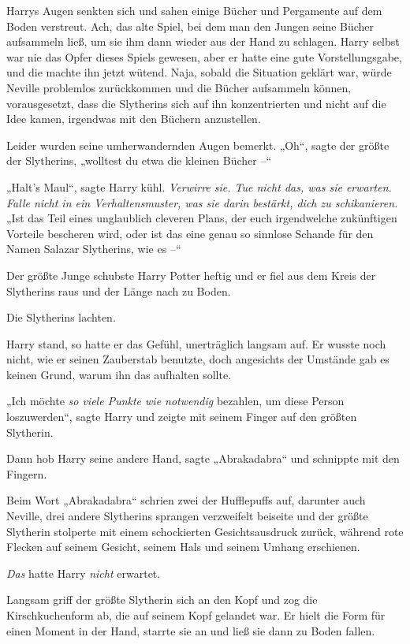 {Harrys Augen senkten sich und sahen einige Bücher und Pergamente auf dem Boden verstreut. Ach, das alte Spiel, bei dem man den Jungen seine Bücher aufsammeln ließ, um sie ihm dann wieder aus der Hand zu schlagen. Harry selbst war nie das Opfer dieses Spiels gewesen, aber er hatte eine gute Vorstellungsgabe, und die machte ihn jetzt wütend. Naja, sobald die Situation geklärt war, würde Neville problemlos zurückkommen und die Bücher aufsammeln können, vorausgesetzt, dass die Slytherins sich auf ihn konzentrierten und nicht auf die Idee kamen, irgendwas mit den Büchern anzustellen.

Leider wurden seine umherwandernden Augen bemerkt. „Oh“, sagte der größte der Slytherins, „wolltest du etwa die kleinen Bücher --“

„Halt's Maul“, sagte Harry kühl. \emph{Verwirre sie. Tue nicht das, was sie erwarten. Falle nicht in ein Verhaltensmuster, was sie darin bestärkt, dich zu schikanieren.} „Ist das Teil eines unglaublich cleveren Plans, der euch irgendwelche zukünftigen Vorteile bescheren wird, oder ist das eine genau so sinnlose Schande für den Namen Salazar Slytherins, wie es --“

Der größte Junge schubste Harry Potter heftig und er fiel aus dem Kreis der Slytherins raus und der Länge nach zu Boden.

Die Slytherins lachten.

Harry stand, so hatte er das Gefühl, unerträglich langsam auf. Er wusste noch nicht, wie er seinen Zauberstab benutzte, doch angesichts der Umstände gab es keinen Grund, warum ihn das aufhalten sollte.

„Ich möchte \emph{so viele Punkte wie notwendig} bezahlen, um diese Person loszuwerden“, sagte Harry und zeigte mit seinem Finger auf den größten Slytherin.

Dann hob Harry seine andere Hand, sagte „Abrakadabra“ und schnippte mit den Fingern.

Beim Wort „Abrakadabra“ schrien zwei der Hufflepuffs auf, darunter auch Neville, drei andere Slytherins sprangen verzweifelt beiseite und der größte Slytherin stolperte mit einem schockierten Gesichtsausdruck zurück, während rote Flecken auf seinem Gesicht, seinem Hals und seinem Umhang erschienen.

\emph{Das} hatte Harry \emph{nicht} erwartet.

Langsam griff der größte Slytherin sich an den Kopf und zog die Kirschkuchenform ab, die auf seinem Kopf gelandet war. Er hielt die Form für einen Moment in der Hand, starrte sie an und ließ sie dann zu Boden fallen.

}
